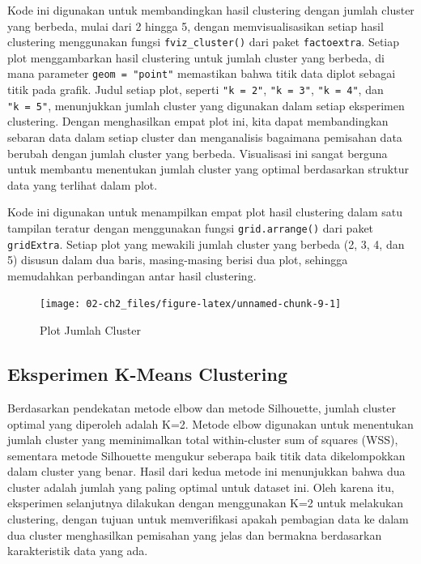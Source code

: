 \documentclass[
  oneside]{book}
\begin{document}
Kode ini digunakan untuk membandingkan hasil clustering dengan jumlah cluster yang berbeda, mulai dari 2 hingga 5, dengan memvisualisasikan setiap hasil clustering menggunakan fungsi \texttt{fviz\_cluster()} dari paket \texttt{factoextra}. Setiap plot menggambarkan hasil clustering untuk jumlah cluster yang berbeda, di mana parameter \texttt{geom\ =\ "point"} memastikan bahwa titik data diplot sebagai titik pada grafik. Judul setiap plot, seperti \texttt{"k\ =\ 2"}, \texttt{"k\ =\ 3"}, \texttt{"k\ =\ 4"}, dan \texttt{"k\ =\ 5"}, menunjukkan jumlah cluster yang digunakan dalam setiap eksperimen clustering. Dengan menghasilkan empat plot ini, kita dapat membandingkan sebaran data dalam setiap cluster dan menganalisis bagaimana pemisahan data berubah dengan jumlah cluster yang berbeda. Visualisasi ini sangat berguna untuk membantu menentukan jumlah cluster yang optimal berdasarkan struktur data yang terlihat dalam plot.

Kode ini digunakan untuk menampilkan empat plot hasil clustering dalam satu tampilan teratur dengan menggunakan fungsi \texttt{grid.arrange()} dari paket \texttt{gridExtra}. Setiap plot yang mewakili jumlah cluster yang berbeda (2, 3, 4, dan 5) disusun dalam dua baris, masing-masing berisi dua plot, sehingga memudahkan perbandingan antar hasil clustering.

\begin{figure}[h]

{\centering \texttt{[image: 02-ch2\_files/figure-latex/unnamed-chunk-9-1]} 

}

\caption{Plot Jumlah Cluster}\label{fig:unnamed-chunk-9}
\end{figure}

\subsection*{Eksperimen K-Means Clustering}\label{eksperimen-k-means-clustering}

Berdasarkan pendekatan metode elbow dan metode Silhouette, jumlah cluster optimal yang diperoleh adalah K=2. Metode elbow digunakan untuk menentukan jumlah cluster yang meminimalkan total within-cluster sum of squares (WSS), sementara metode Silhouette mengukur seberapa baik titik data dikelompokkan dalam cluster yang benar. Hasil dari kedua metode ini menunjukkan bahwa dua cluster adalah jumlah yang paling optimal untuk dataset ini. Oleh karena itu, eksperimen selanjutnya dilakukan dengan menggunakan K=2 untuk melakukan clustering, dengan tujuan untuk memverifikasi apakah pembagian data ke dalam dua cluster menghasilkan pemisahan yang jelas dan bermakna berdasarkan karakteristik data yang ada.
\end{document}
